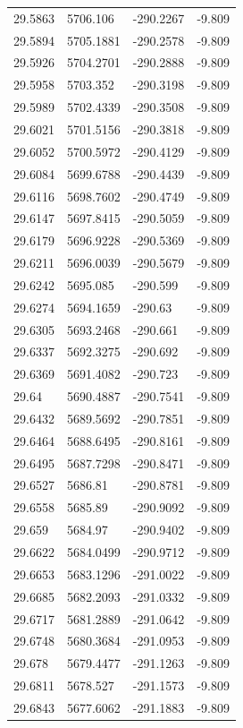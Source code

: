 \begin{table}[H]
\begin{tabular}{llll}
29.5863 & 5706.106 & -290.2267 & -9.809 \\
29.5894 & 5705.1881 & -290.2578 & -9.809 \\
29.5926 & 5704.2701 & -290.2888 & -9.809 \\
29.5958 & 5703.352 & -290.3198 & -9.809 \\
29.5989 & 5702.4339 & -290.3508 & -9.809 \\
29.6021 & 5701.5156 & -290.3818 & -9.809 \\
29.6052 & 5700.5972 & -290.4129 & -9.809 \\
29.6084 & 5699.6788 & -290.4439 & -9.809 \\
29.6116 & 5698.7602 & -290.4749 & -9.809 \\
29.6147 & 5697.8415 & -290.5059 & -9.809 \\
29.6179 & 5696.9228 & -290.5369 & -9.809 \\
29.6211 & 5696.0039 & -290.5679 & -9.809 \\
29.6242 & 5695.085 & -290.599 & -9.809 \\
29.6274 & 5694.1659 & -290.63 & -9.809 \\
29.6305 & 5693.2468 & -290.661 & -9.809 \\
29.6337 & 5692.3275 & -290.692 & -9.809 \\
29.6369 & 5691.4082 & -290.723 & -9.809 \\
29.64 & 5690.4887 & -290.7541 & -9.809 \\
29.6432 & 5689.5692 & -290.7851 & -9.809 \\
29.6464 & 5688.6495 & -290.8161 & -9.809 \\
29.6495 & 5687.7298 & -290.8471 & -9.809 \\
29.6527 & 5686.81 & -290.8781 & -9.809 \\
29.6558 & 5685.89 & -290.9092 & -9.809 \\
29.659 & 5684.97 & -290.9402 & -9.809 \\
29.6622 & 5684.0499 & -290.9712 & -9.809 \\
29.6653 & 5683.1296 & -291.0022 & -9.809 \\
29.6685 & 5682.2093 & -291.0332 & -9.809 \\
29.6717 & 5681.2889 & -291.0642 & -9.809 \\
29.6748 & 5680.3684 & -291.0953 & -9.809 \\
29.678 & 5679.4477 & -291.1263 & -9.809 \\
29.6811 & 5678.527 & -291.1573 & -9.809 \\
29.6843 & 5677.6062 & -291.1883 & -9.809 \\

\end{tabular}
\end{table}
